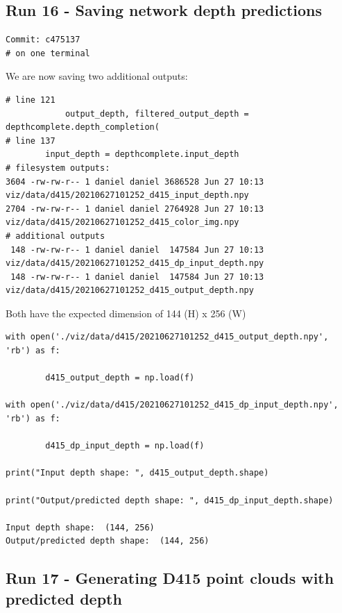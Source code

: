 \subsection{Run 16 - Saving network depth predictions}
\label{app_res:16}
\begin{verbatim}
Commit: c475137
# on one terminal

\end{verbatim}

We are now saving two additional outputs:
\begin{verbatim}
# line 121
            output_depth, filtered_output_depth = depthcomplete.depth_completion(
# line 137
        input_depth = depthcomplete.input_depth
# filesystem outputs:
3604 -rw-rw-r-- 1 daniel daniel 3686528 Jun 27 10:13 viz/data/d415/20210627101252_d415_input_depth.npy
2704 -rw-rw-r-- 1 daniel daniel 2764928 Jun 27 10:13 viz/data/d415/20210627101252_d415_color_img.npy
# additional outputs
 148 -rw-rw-r-- 1 daniel daniel  147584 Jun 27 10:13 viz/data/d415/20210627101252_d415_dp_input_depth.npy
 148 -rw-rw-r-- 1 daniel daniel  147584 Jun 27 10:13 viz/data/d415/20210627101252_d415_output_depth.npy
\end{verbatim}
Both have the expected dimension of 144 (H) x 256 (W)
\begin{verbatim}
with open('./viz/data/d415/20210627101252_d415_output_depth.npy', 'rb') as f:

        d415_output_depth = np.load(f) 

with open('./viz/data/d415/20210627101252_d415_dp_input_depth.npy', 'rb') as f:

        d415_dp_input_depth = np.load(f) 

print("Input depth shape: ", d415_output_depth.shape)      

print("Output/predicted depth shape: ", d415_dp_input_depth.shape)  

Input depth shape:  (144, 256)
Output/predicted depth shape:  (144, 256)
\end{verbatim}

\subsection{Run 17 - Generating D415 point clouds with predicted depth}
\label{app_res:17}

